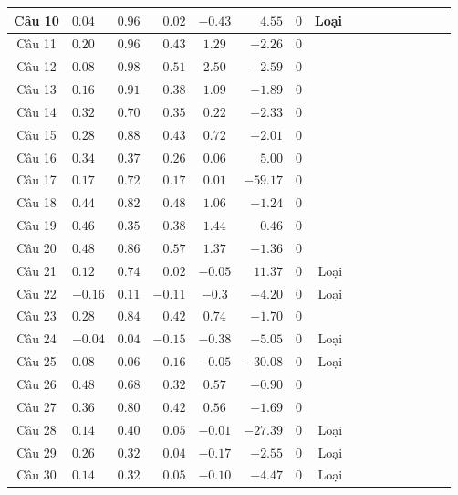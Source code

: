 \begin{longtable}{|Sl|Sr|Sr|Sr|Sr|Sr|Sr|Sc|}
	Câu 10 & $0.04$  & $0.96$ & $0.02$  & $-0.43$ & $4.55$   & $0$ & Loại \\ \hline
	Câu 11 & $0.20$  & $0.96$ & $0.43$  & $1.29$  & $-2.26$  & $0$ &      \\ \hline
	Câu 12 & $0.08$  & $0.98$ & $0.51$  & $2.50$  & $-2.59$  & $0$ &      \\ \hline
	Câu 13 & $0.16$  & $0.91$ & $0.38$  & $1.09$  & $-1.89$  & $0$ &      \\ \hline
	Câu 14 & $0.32$  & $0.70$ & $0.35$  & $0.22$  & $-2.33$  & $0$ &      \\ \hline
	Câu 15 & $0.28$  & $0.88$ & $0.43$  & $0.72$  & $-2.01$  & $0$ &      \\ \hline
	Câu 16 & $0.34$  & $0.37$ & $0.26$  & $0.06$  & $5.00$   & $0$ &      \\ \hline
	Câu 17 & $0.17$  & $0.72$ & $0.17$  & $0.01$  & $-59.17$ & $0$ &      \\ \hline
	Câu 18 & $0.44$  & $0.82$ & $0.48$  & $1.06$  & $-1.24$  & $0$ &      \\ \hline
	Câu 19 & $0.46$  & $0.35$ & $0.38$  & $1.44$  & $0.46$   & $0$ &      \\ \hline
	Câu 20 & $0.48$  & $0.86$ & $0.57$  & $1.37$  & $-1.36$  & $0$ &      \\ \hline
	Câu 21 & $0.12$  & $0.74$ & $0.02$  & $-0.05$ & $11.37$  & $0$ & Loại \\ \hline
	Câu 22 & $-0.16$ & $0.11$ & $-0.11$ & $-0.3$  & $-4.20$  & $0$ & Loại \\ \hline
	Câu 23 & $0.28$  & $0.84$ & $0.42$  & $0.74$  & $-1.70$  & $0$ &      \\ \hline
	Câu 24 & $-0.04$ & $0.04$ & $-0.15$ & $-0.38$ & $-5.05$  & $0$ & Loại \\ \hline
	Câu 25 & $0.08$  & $0.06$ & $0.16$  & $-0.05$ & $-30.08$ & $0$ & Loại \\ \hline
	Câu 26 & $0.48$  & $0.68$ & $0.32$  & $0.57$  & $-0.90$  & $0$ &      \\ \hline
	Câu 27 & $0.36$  & $0.80$ & $0.42$  & $0.56$  & $-1.69$  & $0$ &      \\ \hline
	Câu 28 & $0.14$  & $0.40$ & $0.05$  & $-0.01$ & $-27.39$ & $0$ & Loại \\ \hline
	Câu 29 & $0.26$  & $0.32$ & $0.04$  & $-0.17$ & $-2.55$  & $0$ & Loại \\ \hline
	Câu 30 & $0.14$  & $0.32$ & $0.05$  & $-0.10$ & $-4.47$  & $0$ & Loại \\ \hline
\end{longtable}

